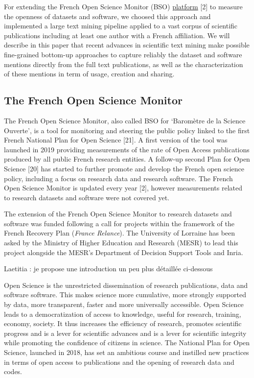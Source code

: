 \documentclass[
]{article}
\begin{document}
For extending the French Open Science Monitor (BSO)
\href{https://frenchopensciencemonitor.esr.gouv.fr}{platform} {[}2{]} to
measure the openness of datasets and software, we choosed this approach
and implemented a large text mining pipeline applied to a vast corpus of
scientific publications including at least one author with a French
affiliation. We will describe in this paper that recent advances in
scientific text mining make possible fine-grained bottom-up approaches
to capture reliably the dataset and software mentions directly from the
full text publications, as well as the characterization of these
mentions in term of usage, creation and sharing.

\hypertarget{the-french-open-science-monitor}{%
\subsection{The French Open Science
Monitor}\label{the-french-open-science-monitor}}

The French Open Science Monitor, also called BSO for `Baromètre de la
Science Ouverte', is a tool for monitoring and steering the public
policy linked to the first French National Plan for Open Science
{[}21{]}. A first version of the tool was launched in 2019 providing
measurements of the rate of Open Access publications produced by all
public French research entities. A follow-up second Plan for Open
Science {[}20{]} has started to further promote and develop the French
open science policy, including a focus on research data and research
software. The French Open Science Monitor is updated every year {[}2{]},
however measurements related to research datasets and software were not
covered yet.

The extension of the French Open Science Monitor to research datasets
and software was funded following a call for projects within the
framework of the French Recovery Plan (\emph{France Relance}). The
University of Lorraine has been asked by the Ministry of Higher
Education and Research (MESR) to lead this project alongside the MESR's
Department of Decision Support Tools and Inria.

Laetitia : je propose une introduction un peu plus détaillée ci-dessous

Open Science is the unrestricted dissemination of research publications,
data and software software. This makes science more cumulative, more
strongly supported by data, more transparent, faster and more
universally accessible. Open Science leads to a democratization of
access to knowledge, useful for research, training, economy, society. It
thus increases the efficiency of research, promotes scientific progress
and is a lever for scientific advances and is a lever for scientific
integrity while promoting the confidence of citizens in science. The
National Plan for Open Science, launched in 2018, has set an ambitious
course and instilled new practices in terms of open access to
publications and the opening of research data and codes.
\end{document}
